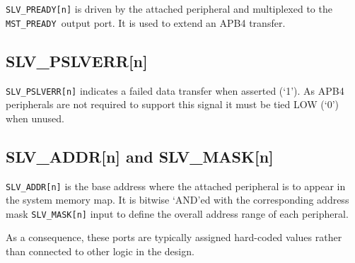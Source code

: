\texttt{SLV\_PREADY[n]} is driven by the attached peripheral and multiplexed
to the \texttt{MST\_PREADY }output port. It is used to extend an APB4 transfer.

\subsection{SLV\_PSLVERR[n]}\label{slv_pslverrn}

\texttt{SLV\_PSLVERR[n]} indicates a failed data transfer when asserted
(`1'). As APB4 peripherals are not required to support this signal it must be
tied LOW (`0') when unused.

\subsection{SLV\_ADDR[n] and SLV\_MASK[n]} \label{slv_addrn-and-slv_maskn}

\texttt{SLV\_ADDR[n]} is the base address where the attached peripheral is to
appear in the system memory map. It is bitwise `AND'ed with the
corresponding address mask \texttt{SLV\_MASK[n]} input to define the overall
address range of each peripheral.

As a consequence, these ports are typically assigned hard-coded values
rather than connected to other logic in the design.
